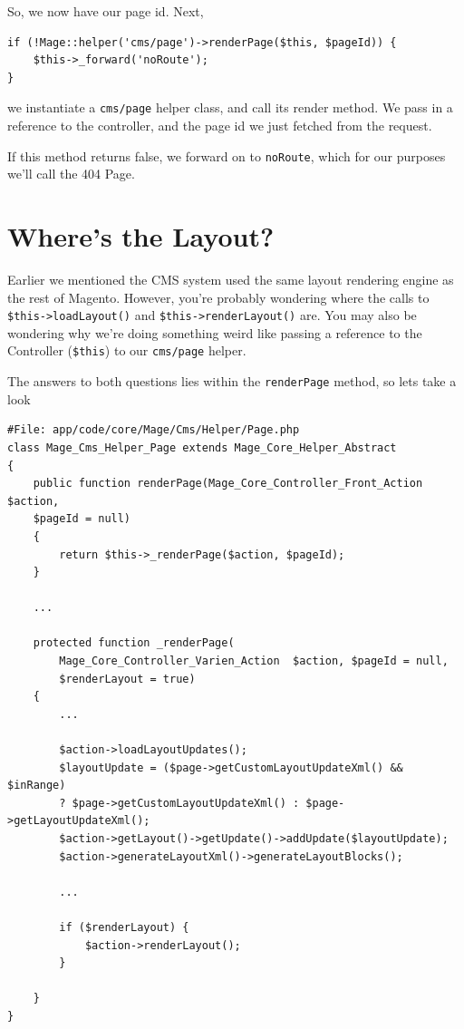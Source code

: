 \documentclass[oneside]{book}
\begin{document}
So, we now have our page id.  Next, 

\begin{lstlisting}
if (!Mage::helper('cms/page')->renderPage($this, $pageId)) {
    $this->_forward('noRoute');
}

\end{lstlisting}


we instantiate a \footnotesize\texttt{cms/page} \normalsize  helper class, and call its render method.  We pass in a reference to the controller, and the page id we just fetched from the request.

If this method returns false, we forward on to \footnotesize\texttt{noRoute}\normalsize, which for our purposes we'll call the 404 Page.

\section{Where's the Layout?}

Earlier we mentioned the CMS system used the same layout rendering engine as the rest of Magento.  However, you're probably wondering where the calls to \footnotesize\texttt{\$this-\textgreater loadLayout()} \normalsize  and \footnotesize\texttt{\$this-\textgreater renderLayout()} \normalsize  are.  You may also be wondering why we're doing something weird like passing a reference to the Controller (\footnotesize\texttt{\$this}\normalsize) to our \footnotesize\texttt{cms/page} \normalsize  helper.

The answers to both questions lies within the \footnotesize\texttt{renderPage} \normalsize  method, so lets take a look

\begin{lstlisting}
#File: app/code/core/Mage/Cms/Helper/Page.php
class Mage_Cms_Helper_Page extends Mage_Core_Helper_Abstract
{
    public function renderPage(Mage_Core_Controller_Front_Action $action,
    $pageId = null)
    {
        return $this->_renderPage($action, $pageId);
    }   

    ...

    protected function _renderPage(
        Mage_Core_Controller_Varien_Action  $action, $pageId = null,
        $renderLayout = true)
    {       
        ...

        $action->loadLayoutUpdates();
        $layoutUpdate = ($page->getCustomLayoutUpdateXml() && $inRange) 
        ? $page->getCustomLayoutUpdateXml() : $page->getLayoutUpdateXml();
        $action->getLayout()->getUpdate()->addUpdate($layoutUpdate);
        $action->generateLayoutXml()->generateLayoutBlocks();           

        ...

        if ($renderLayout) {
            $action->renderLayout();
        }

    }
}

\end{lstlisting}
\end{document}
